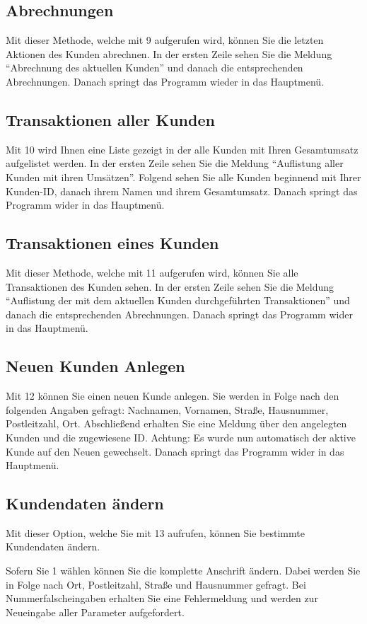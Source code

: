 \documentclass[a4paper,12pt,titlepage]{article}
\begin{document}
\subsection{Abrechnungen}
Mit dieser Methode, welche mit 9 aufgerufen wird, können Sie die letzten Aktionen des Kunden abrechnen.
In der ersten Zeile sehen Sie die Meldung \enquote{Abrechnung des aktuellen Kunden} und danach die entsprechenden Abrechnungen.
Danach springt das Programm wieder in das Hauptmenü.

\subsection{Transaktionen aller Kunden}
Mit 10 wird Ihnen eine Liste gezeigt in der alle Kunden mit Ihren Gesamtumsatz aufgelistet werden.
In der ersten Zeile sehen Sie die Meldung \enquote{Auflistung aller Kunden mit ihren Umsätzen}.
Folgend sehen Sie alle Kunden beginnend mit Ihrer Kunden-ID, danach ihrem Namen und ihrem Gesamtumsatz.
Danach springt das Programm wider in das Hauptmenü.
\subsection{Transaktionen eines Kunden}
Mit dieser Methode, welche mit 11 aufgerufen wird, können Sie alle Transaktionen des Kunden sehen.
In der ersten Zeile sehen Sie die Meldung \enquote{Auflistung der mit dem aktuellen Kunden durchgeführten Transaktionen}
 und danach die entsprechenden Abrechnungen.
Danach springt das Programm wider in das Hauptmenü.
\subsection{Neuen Kunden Anlegen}
Mit 12 können Sie einen neuen Kunde anlegen.
Sie werden in Folge nach den folgenden Angaben gefragt: Nachnamen, Vornamen, Straße, Hausnummer, Postleitzahl, Ort.
Abschließend erhalten Sie eine Meldung über den angelegten Kunden und die zugewiesene ID.
Achtung: Es wurde nun automatisch der aktive Kunde auf den Neuen gewechselt.
Danach springt das Programm wider in das Hauptmenü.
\subsection{Kundendaten ändern}
Mit dieser Option, welche Sie mit 13 aufrufen, können Sie bestimmte Kundendaten ändern.

Sofern Sie 1 wählen können Sie die komplette Anschrift ändern.
Dabei werden Sie in Folge nach Ort, Postleitzahl, Straße und Hausnummer gefragt.
Bei Nummerfalscheingaben erhalten Sie eine Fehlermeldung und werden zur Neueingabe aller Parameter aufgefordert.
\end{document}
